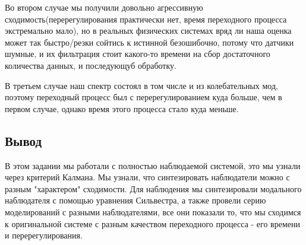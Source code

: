 Во втором случае мы получили довольно агрессивную сходимость(перерегулирования практически нет, время переходного процесса экстремально мало), но в реальных физических системах вряд ли
наша оценка может так быстро/резки сойтись к истинной безошибочно, 
потому что датчики шумные, и их фильтрация стоит какого-то времени на сбор достаточного количества данных, и последующуб обработку.

В третьем случае наш спектр состоял в том числе и из колебательных мод, поэтому переходный процесс был с перерегулированием куда больше, чем в первом случае, однако время этого процесса стало куда меньше.

\subsection{Вывод}
В этом задании мы работали с полностью наблюдаемой системой, это мы узнали через критерий Калмана.
Мы узнали, что синтезировать наблюдатели можно с разным "характером" сходимости. Для наблюдения мы 
синтезировали модального наблюдателя с помощью уравнения Сильвестра, а также провели серию моделирований с разными наблюдателями, все они показали то, 
что мы сходимся к оригинальной системе с разным качеством переходного процесса - его времени и перерегулирования.
\endinput 